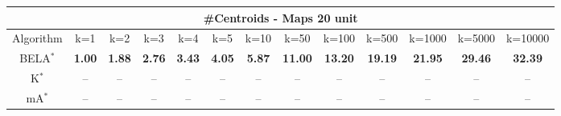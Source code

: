 \begin{tabular}{c|cccccccccccc}\toprule
\multicolumn{13}{c}{#Centroids - Maps 20 unit}\\ \midrule
Algorithm & k=1 & k=2 & k=3 & k=4 & k=5 & k=10 & k=50 & k=100 & k=500 & k=1000 & k=5000 & k=10000 \\ \midrule
BELA$^*$ & \textbf{1.00} & \textbf{1.88} & \textbf{2.76} & \textbf{3.43} & \textbf{4.05} & \textbf{5.87} & \textbf{11.00} & \textbf{13.20} & \textbf{19.19} & \textbf{21.95} & \textbf{29.46} & \textbf{32.39} \\
K$^*$ & -- & -- & -- & -- & -- & -- & -- & -- & -- & -- & -- & -- \\
mA$^*$ & -- & -- & -- & -- & -- & -- & -- & -- & -- & -- & -- & -- \\ \bottomrule 
\end{tabular}
